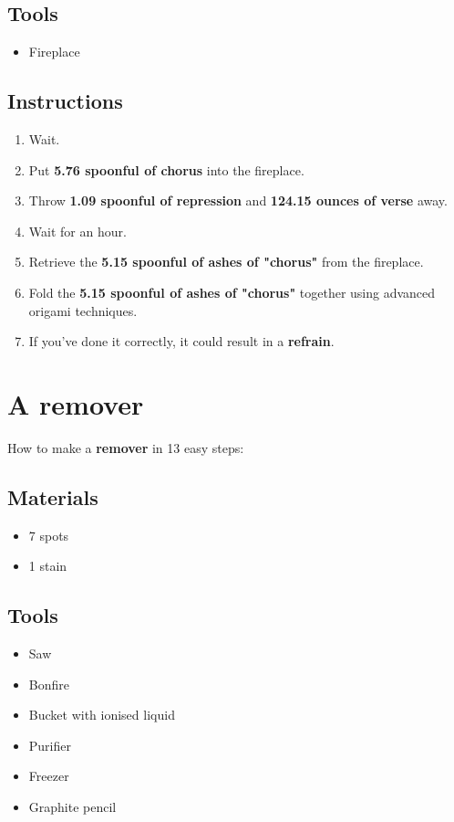 \documentclass{article}
\begin{document}
\subsection{Tools}\begin{itemize}
\item 
Fireplace
\end{itemize}
\subsection{Instructions}\begin{enumerate}
\item 
Wait.
\item 
Put \textbf{5.76 spoonful of chorus} into the fireplace.
\item 
Throw \textbf{1.09 spoonful of repression} and \textbf{124.15 ounces of verse} away.
\item 
Wait for an hour.
\item 
Retrieve the \textbf{5.15 spoonful of ashes of "chorus"} from the fireplace.
\item 
Fold the \textbf{5.15 spoonful of ashes of "chorus"} together using advanced origami techniques.
\item 
If you've done it correctly, it could result in a \textbf{refrain}.
\end{enumerate}
\newpage
\section{A remover}How to make a \textbf{remover} in 13 easy steps:

\subsection{Materials}\begin{itemize}
\item 
7 spots
\item 
1 stain
\end{itemize}
\subsection{Tools}\begin{itemize}
\item 
Saw
\item 
Bonfire
\item 
Bucket with ionised liquid
\item 
Purifier
\item 
Freezer
\item 
Graphite pencil
\end{itemize}
\end{document}
